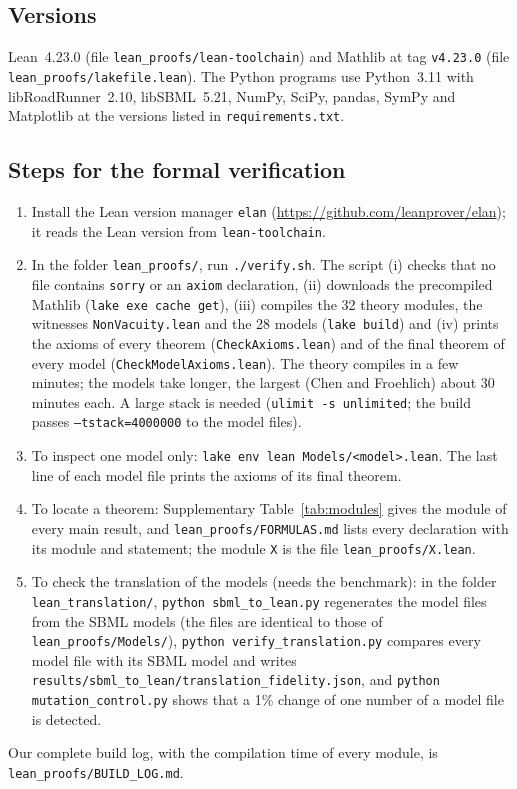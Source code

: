 \subsection*{Versions}
Lean~4.23.0 (file \texttt{lean\_proofs/lean-toolchain}) and Mathlib at tag \texttt{v4.23.0} (file \texttt{lean\_proofs/lakefile.lean}). The Python programs use Python~3.11 with libRoadRunner~2.10, libSBML~5.21, NumPy, SciPy, pandas, SymPy and Matplotlib at the versions listed in \texttt{requirements.txt}.

\subsection*{Steps for the formal verification}
\begin{enumerate}\itemsep0pt
\item Install the Lean version manager \texttt{elan} (\url{https://github.com/leanprover/elan}); it reads the Lean version from \texttt{lean-toolchain}.
\item In the folder \texttt{lean\_proofs/}, run \texttt{./verify.sh}. The script (i) checks that no file contains \texttt{sorry} or an \texttt{axiom} declaration, (ii) downloads the precompiled Mathlib (\texttt{lake exe cache get}), (iii) compiles the 32 theory modules, the witnesses \texttt{NonVacuity.lean} and the 28 models (\texttt{lake build}) and (iv) prints the axioms of every theorem (\texttt{CheckAxioms.lean}) and of the final theorem of every model (\texttt{CheckModelAxioms.lean}). The theory compiles in a few minutes; the models take longer, the largest (Chen and Froehlich) about 30 minutes each. A large stack is needed (\texttt{ulimit -s unlimited}; the build passes \texttt{--tstack=4000000} to the model files).
\item To inspect one model only: \texttt{lake env lean Models/<model>.lean}. The last line of each model file prints the axioms of its final theorem.
\item To locate a theorem: Supplementary Table~\ref{tab:modules} gives the module of every main result, and \texttt{lean\_proofs/FORMULAS.md} lists every declaration with its module and statement; the module \texttt{X} is the file \texttt{lean\_proofs/X.lean}.
\item To check the translation of the models (needs the benchmark): in the folder \texttt{lean\_translation/}, \texttt{python sbml\_to\_lean.py} regenerates the model files from the SBML models (the files are identical to those of \texttt{lean\_proofs/Models/}), \texttt{python verify\_translation.py} compares every model file with its SBML model and writes \texttt{results/sbml\_to\_lean/translation\_fidelity.json}, and \texttt{python mutation\_control.py} shows that a 1\% change of one number of a model file is detected.
\end{enumerate}
Our complete build log, with the compilation time of every module, is \texttt{lean\_proofs/BUILD\_LOG.md}.

